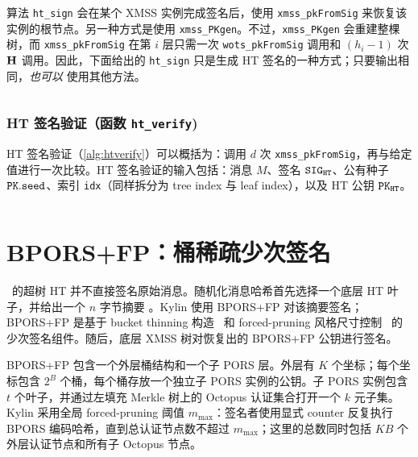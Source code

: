 算法 \texttt{ht\_sign} 会在某个 XMSS 实例完成签名后，使用 \texttt{xmss\_pkFromSig} 来恢复该实例的根节点。另一种方式是使用 \texttt{xmss\_PKgen}。不过，\texttt{xmss\_PKgen} 会重建整棵树，而 \texttt{xmss\_pkFromSig} 在第 $i$ 层只需一次 \texttt{wots\_pkFromSig} 调用和 $(h_i-1)$ 次 $\mathbf{H}$ 调用。因此，下面给出的 \texttt{ht\_sign} 只是生成 HT 签名的一种方式；只要输出相同，\textit{也可以} 使用其他方法。

\begin{algorithm}
    \inputminted[breaklines,linenos,tabsize=2,mathescape,escapeinside=||]{C}{paper/code/ht_sign.cs}
    \caption{\texttt{ht\_sign} --- 生成 HT 签名。}
    \label{alg:htsign}
\end{algorithm}

\subsubsection{HT 签名验证（函数 \texttt{ht\_verify})}

HT 签名验证（\cref{alg:htverify}）可以概括为：调用 $d$ 次 \texttt{xmss\_pkFromSig}，再与给定值进行一次比较。HT 签名验证的输入包括：消息 $M$、签名 $\mathtt{SIG}_\mathtt{HT}$、公有种子 $\pk.\seed$、索引 \texttt{idx}（同样拆分为 tree index 与 leaf index），以及 HT 公钥 $\pk_{\mathtt{HT}}$。

\begin{algorithm}
    \inputminted[breaklines,linenos,tabsize=2,mathescape,escapeinside=||]{C}{paper/code/ht_verify.cs}
    \caption{\texttt{ht\_verify} --- 使用 HT 公钥 ${\bf PK}_{HT}$ 验证消息 $M$ 上的 HT 签名 $\bf {SIG}_{HT}$。}
    \label{alg:htverify}
\end{algorithm}
\section{BPORS+FP：桶稀疏少次签名}
\label{sec:bpors}

\SPHINCSA\ 的超树 HT 并不直接签名原始消息。随机化消息哈希首先选择一个底层 HT 叶子，并给出一个 $n$ 字节摘要 \md。Kylin 使用 BPORS+FP 对该摘要签名；BPORS+FP 是基于 bucket thinning 构造~\cite{bucketthinning} 和 forced-pruning 风格尺寸控制~\cite{EPRINT:AbrKat25} 的少次签名组件。随后，底层 XMSS 树对恢复出的 BPORS+FP 公钥进行签名。

BPORS+FP 包含一个外层桶结构和一个子 PORS 层。外层有 $K$ 个坐标；每个坐标包含 $2^B$ 个桶，每个桶存放一个独立子 PORS 实例的公钥。子 PORS 实例包含 $t$ 个叶子，并通过左填充 Merkle 树上的 Octopus 认证集合打开一个 $k$ 元子集。Kylin 采用全局 forced-pruning 阈值 $m_{\max}$：签名者使用显式 counter 反复执行 BPORS 编码哈希，直到总认证节点数不超过 $m_{\max}$；这里的总数同时包括 $KB$ 个外层认证节点和所有子 Octopus 节点。

